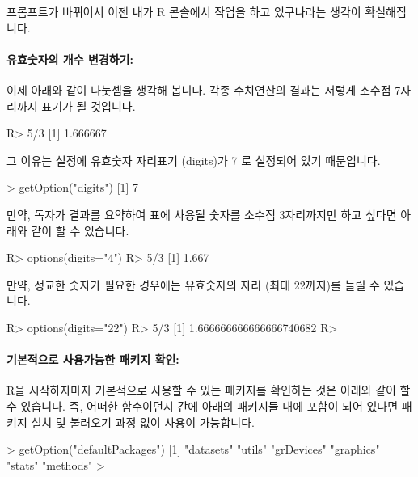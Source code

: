 프롬프트가 바뀌어서 이젠 내가 R 콘솔에서 작업을 하고 있구나라는 생각이 확실해집니다.

\paragraph{유효숫자의 개수 변경하기: } 이제 아래와 같이 나눗셈을 생각해 봅니다. 
각종 수치연산의 결과는 저렇게 소수점 7자리까지 표기가 될 것입니다. 

\begin{Schunk}
\begin{Soutput}
R> 5/3
[1] 1.666667
\end{Soutput}
\end{Schunk}

그 이유는 설정에 유효숫자 자리표기 (digits)가 7 로 설정되어 있기 때문입니다. 

\begin{Schunk}
\begin{Soutput}
> getOption("digits")
[1] 7
\end{Soutput}
\end{Schunk}

만약, 독자가 결과를 요약하여 표에 사용될 숫자를 소수점 3자리까지만 하고 싶다면 아래와 같이 할 수 있습니다. 

\begin{Schunk}
\begin{Soutput}
R> options(digits="4")
R> 5/3
[1] 1.667
\end{Soutput}
\end{Schunk}

만약, 정교한 숫자가 필요한 경우에는 유효숫자의 자리 (최대 22까지)를 늘릴 수 있습니다. 

\begin{Schunk}
\begin{Soutput}
R> options(digits="22")
R> 5/3
[1] 1.666666666666666740682
R> 
\end{Soutput}
\end{Schunk}

\paragraph{기본적으로 사용가능한 패키지 확인:} 
R을 시작하자마자 기본적으로 사용할 수 있는 패키지를 확인하는 것은 아래와 같이 할 수 있습니다. 
즉, 어떠한 함수이던지 간에 아래의 패키지들 내에 포함이 되어 있다면 패키지 설치 및 불러오기 과정 없이 사용이 가능합니다. 
 
\begin{Schunk}
\begin{Soutput}
> getOption("defaultPackages")
[1] "datasets"  "utils"     "grDevices" "graphics"  "stats"     "methods"  
> 
\end{Soutput}
\end{Schunk}

